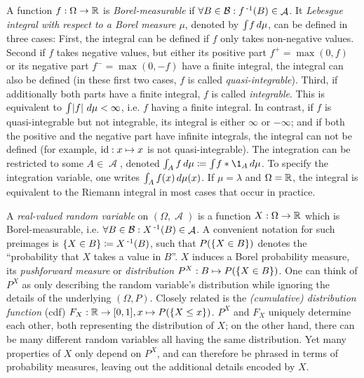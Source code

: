 \documentclass[a4paper]{scrreprt}
\DeclareMathOperator{\A}{\mathcal{A}}
\newcommand{\B}{\mathcal{B}}
\theoremstyle{definition}
\begin{document}
    A function $f: \Omega \to \mathbb{R}$ is \emph{Borel-measurable} if $\forall B \in \B: f\inv(B) \in \A$.
    It \emph{Lebesgue integral with respect to a Borel measure $\mu$}, denoted by $\int_{} f \, d\mu$, can be defined in three cases:
    First, the integral can be defined if $f$ only takes non-negative values.
    Second if $f$ takes negative values, but either its positive part $f^+ = \max(0, f)$ or its negative part $f^- = \max(0, -f)$ have a finite integral, the integral can also be defined (in these first two cases, $f$ is called \emph{quasi-integrable}).
    Third, if additionally both parts have a finite integral, $f$ is called \emph{integrable}. This is equivalent to $\int_{} \left| f \right| \, d\mu < \infty$, i.e. $f$ having a finite integral.
    In contrast, if $f$ is quasi-integrable but not integrable, its integral is either $\infty$ or $-\infty$; and if both the positive and the negative part have infinite integrals, the integral can not be defined (for example, $\operatorname{id}: x \mapsto x$ is not quasi-integrable).
    The integration can be restricted to some $A \in \A$, denoted $\lintegral{A}{f}{\mu} \coloneqq \lintegral{}{f*\1_A}{\mu}$. To specify the integration variable, one writes $\int_{A} f(x) \, d\mu(x)$.
    If $\mu = \lambda$ and $\Omega = \mathbb{R}$, the integral is equivalent to the Riemann integral in most cases that occur in practice.
    
    
    A \emph{real-valued random variable} on $(\Omega, \A)$ is a function $X: \Omega \to \mathbb{R}$ which is Borel-measurable, i.e. $\forall B \in \B: X\inv(B) \in \A$. 
    A convenient notation for such preimages is $\{X \in B\} \coloneqq X\operatorname{^{-1}}(B)$, such that $P(\{X \in B\})$ denotes the “probability that $X$ takes a value in $B$”.
    $X$ induces a Borel probability measure, its \emph{pushforward measure} or \emph{distribution} $P^X: B \mapsto P(\{X \in B\})$. One can think of $P^X$ as only describing the random variable's distribution while ignoring the details of the underlying $(\Omega, P)$.
    Closely related is the \emph{(cumulative) distribution function} (cdf) $F_X: \mathbb{R} \to [0, 1], x \mapsto P(\{X \leq x\})$.
    $P^X$ and $F_X$ uniquely determine each other, both representing the distribution of $X$; on the other hand, there can be many different random variables all having the same distribution.
    Yet many properties of $X$ only depend on $P^X$, and can therefore be phrased in terms of probability measures, leaving out the additional details encoded by $X$.
    
\end{document}
